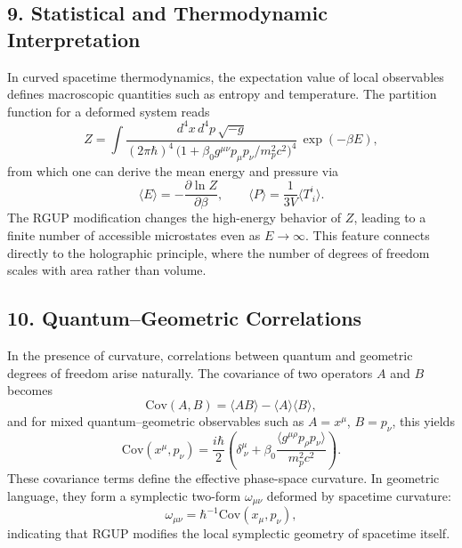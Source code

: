 \documentclass[11pt,oneside]{book}
\numberwithin{equation}{chapter}
\begin{document}
\subsection*{9. Statistical and Thermodynamic Interpretation}

In curved spacetime thermodynamics, the expectation value of local observables defines macroscopic quantities such as entropy and temperature.  
The partition function for a deformed system reads
\begin{equation}
Z = \int \frac{d^4x\,d^4p\,\sqrt{-g}}
{(2\pi\hbar)^4\,
\big(1+\beta_0 g^{\mu\nu}p_\mu p_\nu/m_p^2 c^2\big)^4}\,
\exp(-\beta E),
\end{equation}
from which one can derive the mean energy and pressure via
\begin{equation}
\langle E \rangle = -\frac{\partial \ln Z}{\partial \beta},
\qquad
\langle P \rangle = \frac{1}{3V}\langle T^i_{\ i}\rangle.
\end{equation}
The RGUP modification changes the high-energy behavior of $Z$, leading to a finite number of accessible microstates even as $E\to\infty$.  
This feature connects directly to the holographic principle, where the number of degrees of freedom scales with area rather than volume.

\subsection*{10. Quantum–Geometric Correlations}

In the presence of curvature, correlations between quantum and geometric degrees of freedom arise naturally.  
The covariance of two operators $A$ and $B$ becomes
\begin{equation}
\text{Cov}(A,B)
= \langle AB\rangle - \langle A\rangle\langle B\rangle,
\end{equation}
and for mixed quantum–geometric observables such as $A=x^\mu$, $B=p_\nu$, this yields
\begin{equation}
\text{Cov}(x^\mu,p_\nu)
= \frac{i\hbar}{2}\!\left(
\delta^\mu_{\ \nu}
+ \beta_0\frac{\langle g^{\mu\rho}p_\rho p_\nu\rangle}{m_p^2 c^2}
\right).
\end{equation}
These covariance terms define the effective phase-space curvature.  
In geometric language, they form a symplectic two-form $\omega_{\mu\nu}$ deformed by spacetime curvature:
\begin{equation}
\omega_{\mu\nu}
= \hbar^{-1}\text{Cov}(x_\mu,p_\nu),
\end{equation}
indicating that RGUP modifies the local symplectic geometry of spacetime itself. \vspace{0.8em}
\end{document}
